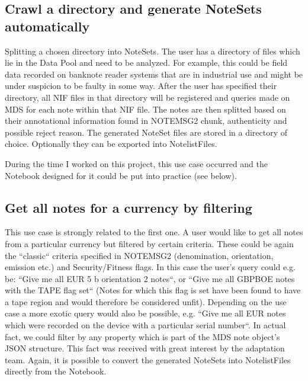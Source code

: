 \subsection{Crawl a directory and generate NoteSets automatically}
\label{subsection:crawl_dir}
Splitting a chosen directory into NoteSets. The user has a directory of files which lie in the Data Pool and need to be analyzed. For example, this could be field data recorded on banknote reader systems that are in industrial use and might be under suspicion to be faulty in some way. After the user has specified their directory, all NIF files in that directory will be registered and queries made on MDS for each note within that NIF file. The notes are then splitted based on their annotational information found in NOTEMSG2 chunk, authenticity and possible reject reason. The generated NoteSet files are stored in a directory of choice. Optionally they can be exported into NotelistFiles.\par
During the time I worked on this project, this use case occurred and the Notebook designed for it could be put into practice (see below).
\subsection{Get all notes for a currency by filtering}
This use case is strongly related to the first one. A user would like to get all notes from a particular currency but filtered by certain criteria. These could be again the ``classic`` criteria specified in NOTEMSG2 (denomination, orientation, emission etc.) and Security/Fitness flags. In this case the user's query could e.g. be: ``Give me all EUR 5 b orientation 2 notes``, or ``Give me all GBPBOE notes with the TAPE flag set`` (Notes for which this flag is set have been found to have a tape region and would therefore be considered unfit). Depending on the use case a more exotic query would also be possible, e.g. ``Give me all EUR notes which were recorded on the device with a particular serial number``. In actual fact, we could filter by any property which is part of the MDS note object's JSON structure. This fact was received with great interest by the adaptation team. Again, it is possible to convert the generated NoteSets into NotelistFiles directly from the Notebook.
